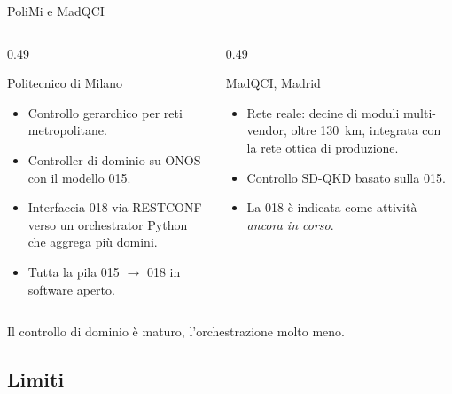 \documentclass[10pt]{beamer}
\begin{document}
\begin{frame}{PoliMi e MadQCI}
  \begin{columns}[T]
    \begin{column}{0.49\textwidth}
      \begin{block}{Politecnico di Milano~\cite{vicario2025}}
        \small
        \begin{itemize}
          \item Controllo gerarchico per reti metropolitane.
          \item Controller di dominio su ONOS con il modello 015.
          \item Interfaccia 018 via RESTCONF verso un orchestrator Python
                che aggrega più domini.
          \item Tutta la pila 015 $\to$ 018 in software aperto.
        \end{itemize}
      \end{block}
    \end{column}
    \begin{column}{0.49\textwidth}
      \begin{block}{MadQCI, Madrid~\cite{madqci2024}}
        \small
        \begin{itemize}
          \item Rete reale: decine di moduli multi-vendor, oltre 130~km,
                integrata con la rete ottica di produzione.
          \item Controllo SD-QKD basato sulla 015.
          \item La 018 è indicata come attività \emph{ancora in corso}.
        \end{itemize}
      \end{block}
    \end{column}
  \end{columns}
  \vspace{2ex}
  \centering Il controllo di dominio è maturo, l'\alert{orchestrazione}
  molto meno.
\end{frame}


\subsection{Limiti}
\end{document}
